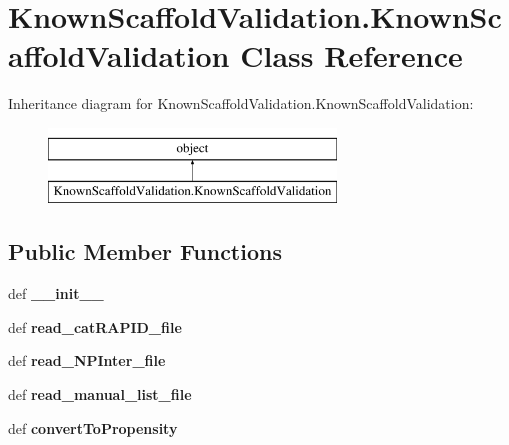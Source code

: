 \hypertarget{classKnownScaffoldValidation_1_1KnownScaffoldValidation}{\section{Known\-Scaffold\-Validation.\-Known\-Scaffold\-Validation Class Reference}
\label{classKnownScaffoldValidation_1_1KnownScaffoldValidation}
}
Inheritance diagram for Known\-Scaffold\-Validation.\-Known\-Scaffold\-Validation\-:\begin{figure}[H]
\begin{center}
\leavevmode
\includegraphics[height=2.000000cm]{classKnownScaffoldValidation_1_1KnownScaffoldValidation}
\end{center}
\end{figure}
\subsection*{Public Member Functions}
\begin{DoxyCompactItemize}
\item 
\hypertarget{classKnownScaffoldValidation_1_1KnownScaffoldValidation_a8208ea6ca4bf58be3de6b52e6fc2e534}{def {\bfseries \-\_\-\-\_\-init\-\_\-\-\_\-}}\label{classKnownScaffoldValidation_1_1KnownScaffoldValidation_a8208ea6ca4bf58be3de6b52e6fc2e534}

\item 
\hypertarget{classKnownScaffoldValidation_1_1KnownScaffoldValidation_a40a1f0303c948edf857b6e027c670dbe}{def {\bfseries read\-\_\-cat\-R\-A\-P\-I\-D\-\_\-file}}\label{classKnownScaffoldValidation_1_1KnownScaffoldValidation_a40a1f0303c948edf857b6e027c670dbe}

\item 
\hypertarget{classKnownScaffoldValidation_1_1KnownScaffoldValidation_a8902b56c40173ea2b8e44ec2a84c43f6}{def {\bfseries read\-\_\-\-N\-P\-Inter\-\_\-file}}\label{classKnownScaffoldValidation_1_1KnownScaffoldValidation_a8902b56c40173ea2b8e44ec2a84c43f6}

\item 
\hypertarget{classKnownScaffoldValidation_1_1KnownScaffoldValidation_aeea1918f29bee932d8aeab7f44e7a0b2}{def {\bfseries read\-\_\-manual\-\_\-list\-\_\-file}}\label{classKnownScaffoldValidation_1_1KnownScaffoldValidation_aeea1918f29bee932d8aeab7f44e7a0b2}

\item 
\hypertarget{classKnownScaffoldValidation_1_1KnownScaffoldValidation_ac472671daa0b785da6d6bfffdfc6571c}{def {\bfseries convert\-To\-Propensity}}\label{classKnownScaffoldValidation_1_1KnownScaffoldValidation_ac472671daa0b785da6d6bfffdfc6571c}

\end{DoxyCompactItemize}

